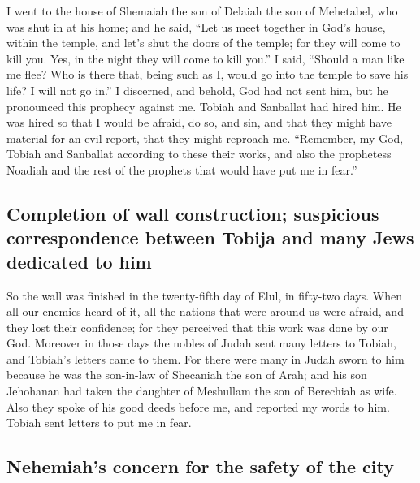  I went to the house of Shemaiah the son of Delaiah the
son of Mehetabel, who was shut in at his home; and he said, ``Let us
meet together in God's house, within the temple, and let's shut the
doors of the temple; for they will come to kill you. Yes, in the night
they will come to kill you.''  I said, ``Should a man
like me flee? Who is there that, being such as I, would go into the
temple to save his life? I will not go in.''  I
discerned, and behold, God had not sent him, but he pronounced this
prophecy against me. Tobiah and Sanballat had hired him. 
He was hired so that I would be afraid, do so, and sin, and that they
might have material for an evil report, that they might reproach me.
 ``Remember, my God, Tobiah and Sanballat according to
these their works, and also the prophetess Noadiah and the rest of the
prophets that would have put me in fear.''

\hypertarget{completion-of-wall-construction-suspicious-correspondence-between-tobija-and-many-jews-dedicated-to-him}{%
\subsection{Completion of wall construction; suspicious correspondence
between Tobija and many Jews dedicated to
him}\label{completion-of-wall-construction-suspicious-correspondence-between-tobija-and-many-jews-dedicated-to-him}}

 So the wall was finished in the twenty-fifth day of
Elul, in fifty-two days.  When all our enemies heard of
it, all the nations that were around us were afraid, and they lost their
confidence; for they perceived that this work was done by our God.
 Moreover in those days the nobles of Judah sent many
letters to Tobiah, and Tobiah's letters came to them. 
For there were many in Judah sworn to him because he was the son-in-law
of Shecaniah the son of Arah; and his son Jehohanan had taken the
daughter of Meshullam the son of Berechiah as wife.  Also
they spoke of his good deeds before me, and reported my words to him.
Tobiah sent letters to put me in fear.

\hypertarget{nehemiahs-concern-for-the-safety-of-the-city}{%
\subsection{Nehemiah's concern for the safety of the
city}\label{nehemiahs-concern-for-the-safety-of-the-city}}

